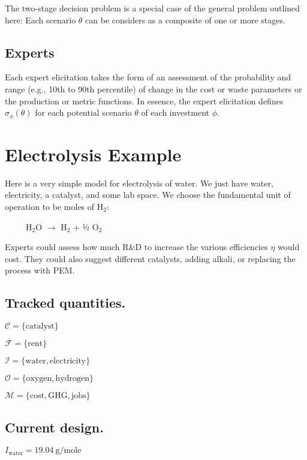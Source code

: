 \documentclass[letterpaper,10pt,english]{sphinxmanual}
\begin{document}
The two-stage decision problem is a special case of the general problem
outlined here: Each scenario \(\theta\) can be considers as a
composite of one or more stages.


\section{Experts}
\label{\detokenize{doc-src/formulation:experts}}
Each expert elicitation takes the form of an assessment of the
probability and range (e.g., 10th to 90th percentile) of change in the
cost or waste parameters or the production or metric functions. In
essence, the expert elicitation defines \(\sigma_\phi(\theta)\) for
each potential scenario \(\theta\) of each investment \(\phi\).


\chapter{Electrolysis Example}
\label{\detokenize{doc-src/example-electrolysis:electrolysis-example}}\label{\detokenize{doc-src/example-electrolysis::doc}}
Here is a very simple model for electrolysis of water. We just have
water, electricity, a catalyst, and some lab space. We choose the
fundamental unit of operation to be moles of H$_{\text{2}}$:

     H$_{\text{2}}$O \(\rightarrow\) H$_{\text{2}}$ + ½ O$_{\text{2}}$

Experts could assess how much R\&D to increase the various efficiencies
\(\eta\) would cost. They could also suggest different catalysts,
adding alkali, or replacing the process with PEM.


\section{Tracked quantities.}
\label{\detokenize{doc-src/example-electrolysis:tracked-quantities}}
\(\mathcal{C} = \{ \mathrm{catalyst} \}\)

\(\mathcal{F} = \{ \mathrm{rent} \}\)

\(\mathcal{I} = \{ \mathrm{water}, \mathrm{electricity} \}\)

\(\mathcal{O} = \{ \mathrm{oxygen}, \mathrm{hydrogen} \}\)

\(\mathcal{M} = \{ \mathrm{cost}, \mathrm{GHG}, \mathrm{jobs} \}\)


\section{Current design.}
\label{\detokenize{doc-src/example-electrolysis:current-design}}
\(I_\mathrm{water} = 19.04~\mathrm{g/mole}\)
\end{document}
